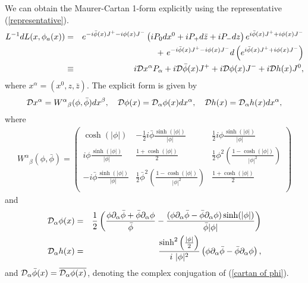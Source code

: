 \documentclass[a4paper,12pt]{article}
\begin{document}
We can obtain the Maurer-Cartan 1-form explicitly using the
representative (\ref{representative}). 
\begin{eqnarray}
L^{-1}dL(x,\phi_{a}(x)) &=& e^{-i \bar{\phi}(x)J^{+}-i \phi(x) J^{-}}
\left( i P_{0} dx^{0} + i P_{+} d\bar{z} + i P_{-} dz \right) 
e^{i \bar{\phi}(x)J^{+}+i \phi(x) J^{-}} \nonumber \\
&& +~e^{-i \bar{\phi}(x)J^{+}-i \phi(x) J^{-}} 
d \left( e^{i \bar{\phi}(x)J^{+}+i \phi(x) J^{-}} \right) \\
&\equiv& i {\cal D}x^{\alpha} P_{\alpha} + i {\cal D} \bar{\phi}(x)
J^{+} + i {\cal D} \phi(x) J^{-} + i {\cal D} h(x) J^{0},
\end{eqnarray}
where $x^{\alpha} = (x^{0}, z, \bar{z})$.
The explicit form is given by
\begin{eqnarray}
{\cal D}x^{\alpha} = W^{\alpha}{}_{\beta}(\phi, \bar{\phi}) 
dx^{\beta}, \quad 
{\cal D} \phi(x) = {\cal D}_{\alpha} \phi(x) dx^{\alpha}, \quad
{\cal D} h(x) = {\cal D}_{\alpha} h(x) dx^{\alpha},  
\end{eqnarray}
where
\begin{eqnarray}
W^{\alpha}{}_{\beta}(\phi, \bar{\phi})= 
\left( 
\begin{array}{ccc}
\cosh(|\phi|) & -\frac{1}{2}i\bar{\phi}\frac{\sinh(|\phi|)}{|\phi|} & 
\frac{1}{2}i\phi\frac{\sinh(|\phi|)}{|\phi|} \\
i\phi\frac{\sinh(|\phi|)}{|\phi|} & 
\frac{1 + \cosh(|\phi|)}{2} &
\frac{1}{2}\phi^2 \left(\frac{1 - \cosh(|\phi|)}{|\phi|^2}\right) \\
-i\bar{\phi}\frac{\sinh(|\phi|)}{|\phi|} & 
\frac{1}{2}\bar{\phi}^2 \left(\frac{1 - \cosh(|\phi|)}{|\phi|^2}\right) &
\frac{1 + \cosh(|\phi|)}{2} \\
\end{array}
\right)
\end{eqnarray}
and 
\begin{eqnarray}
{\cal D}_{\alpha} \phi(x) &=& \frac{1}{2}\left( \frac{\phi
\partial_{\alpha} \bar{\phi} + \bar{\phi}
\partial_{\alpha} \phi}{\bar{\phi}}-\frac{(\phi
\partial_{\alpha} \bar{\phi} - \bar{\phi} \partial_{\alpha} \phi) 
\sinh(|\phi|)}{\bar{\phi}|\phi|} \right) \label{cartan of phi}\\ 
{\cal D}_{\alpha} h(x) &=&
\frac{\sinh^{2}\left(\frac{|\phi|}{2}\right)}{i~|\phi|^{2}} \left(\phi
\partial_{\alpha} \bar{\phi} - \bar{\phi} \partial_{\alpha} \phi \right),  
\end{eqnarray}
and ${\cal D}_{\alpha} \bar{\phi}(x) = \overline{{\cal D}_{\alpha}
\phi(x)}$, denoting the complex conjugation of (\ref{cartan of phi}).
\end{document}
